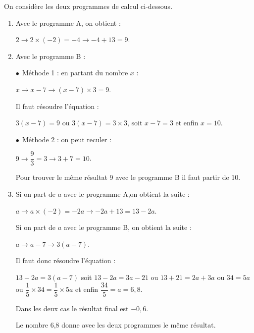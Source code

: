 
\medskip

On considère les deux programmes de calcul ci-dessous. 


\begin{enumerate}
\item %
Avec le programme A, on obtient :

$2 \to 2 \times (- 2) = - 4 \to - 4 + 13 = 9$. 
\item %
Avec le programme B :

$\bullet~~$Méthode 1 : en partant du nombre $x$ :

$x \to x - 7 \to (x - 7) \times 3 = 9$.

Il faut résoudre l'équation :

$3(x - 7) = 9$ ou $3(x - 7) = 3\times 3$, soit $x - 7 = 3$ et enfin $x = 10$.

$\bullet~~$Méthode 2 : on peut \og reculer \fg{} :

$9 \to \dfrac{9}{3} = 3 \to 3 + 7 = 10$.

Pour trouver le même résultat 9 avec le programme B il faut partir de 10. 
\item %
Si on part de $a$ avec le programme A,on obtient la suite :

$a \to a \times (- 2) = - 2a \to - 2a + 13 = 13 - 2a$.

Si on part de $a$ avec le programme B, on obtient la suite :

$a \to a - 7  \to 3(a - 7)$.

Il faut donc résoudre l'équation :

$13 - 2a = 3(a - 7)$ soit $13 - 2a = 3a - 21$ ou $13 + 21 = 2a + 3a$ ou $34 = 5a$ ou  $\dfrac{1}{5}\times 34 = \dfrac{1}{5}\times 5a$ et enfin $\dfrac{34}{5} = a = 6,8$.

Dans les deux cas le résultat final est $- 0,6$.

Le nombre 6,8 donne avec les deux programmes le même résultat.
\end{enumerate} 

\bigskip

